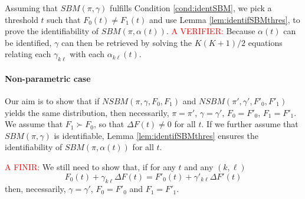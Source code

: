 Assuming that $SBM(\pi, \gamma)$ fulfills Condition \ref{cond:identSBM}, we pick a threshold $t$ such that $F_0(t) \neq F_1(t)$ and use Lemma \ref{lem:identifSBMthres}, to prove the identifiability of $SBM(\pi, \alpha(t))$. \textcolor{red}{A VERIFIER:} Because $\alpha(t)$ can be identified, $\gamma$ can then be retrieved by solving the $K(K+1)/2$ equations relating each $\gamma_{k\ell}$ with each $\alpha_{k\ell}(t)$. 

\paragraph{Non-parametric case}
Our aim is to show that if $NSBM(\pi, \gamma, F_0, F_1)$ and $NSBM(\pi', \gamma', F'_0, F'_1)$ yields the same distribution, then necessarily, $\pi = \pi'$, $\gamma = \gamma'$, $F_0 = F'_0$, $F_1 = F'_1$. We assume that $F_1 \succ F_0$, so that $\Delta F(t) \neq 0$ for all $t$. If we further assume that $SBM(\pi, \gamma)$ is identifiable, Lemma \ref{lem:identifSBMthres} ensures the identifiability of $SBM(\pi, \alpha(t))$ for all $t$.

\textcolor{red}{A FINIR:} We still need to show that, if for any $t$ and any $(k, \ell)$
$$
F_0(t) + \gamma_{k\ell} \Delta F(t) = F'_0(t) + \gamma'_{k\ell} \Delta F'(t)
$$
then, necessarily, $\gamma = \gamma'$, $F_0 = F'_0$ and $F_1 = F'_1$.








